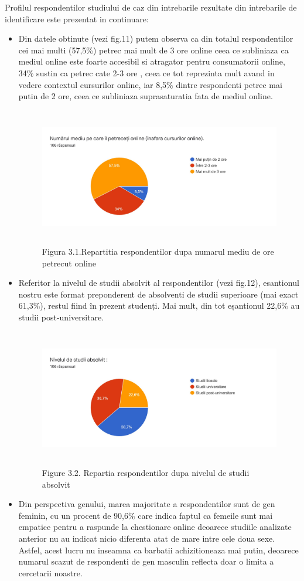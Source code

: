 \documentclass[a4paper, 12pt]{article}
\begin{document}
		\qquad Profilul respondentilor studiului de caz din intrebarile rezultate din intrebarile de identificare este prezentat in continuare:
		\begin{itemize}
			\item Din datele obtinute (vezi fig.11) putem observa ca din totalul respondentilor cei mai multi (57,5\%) petrec mai mult de 3 ore online ceea ce subliniaza ca mediul online este foarte accesibil si atragator pentru consumatorii online, 34\% sustin ca petrec cate 2-3 ore , ceea ce tot reprezinta mult avand in vedere contextul cursurilor online, iar 8,5\% dintre respondenti petrec mai putin de 2 ore, ceea ce subliniaza suprasaturatia  fata de mediul online.
			\begin{figure}[!htb]
				\centering
				\includegraphics[width=13cm, height=6cm]{"figures/prima.jpg"}
				\caption{Figura 3.1.Repartitia respondentilor dupa numarul mediu de ore petrecut online}\label{fig:zece}
			\end{figure}
	\newpage
		\item Referitor la nivelul de studii absolvit al respondentilor (vezi fig.12), esantionul nostru este format  preponderent de absolventi de studii superioare (mai exact 61,3\%), restul fiind în prezent studenți. Mai mult, din tot eșantionul 22,6\% au studii post-universitare.
			\begin{figure}[!htb]
			\centering
			\includegraphics[width=13cm, height=6cm]{"figures/doi.jpg"}
			\caption{Figure 3.2. Repartia respondentilor dupa nivelul de studii absolvit}\label{fig:zece}
		\end{figure}
		\item Din perspectiva genului, marea majoritate a respondentilor sunt de gen feminin, cu un procent de 90,6\% care indica faptul ca femeile sunt mai empatice pentru a raspunde la chestionare online deoarece studiile analizate anterior nu au indicat nicio diferenta atat de mare intre cele doua sexe. Astfel, acest lucru nu inseamna ca barbatii achizitioneaza mai putin, deoarece numarul scazut de respondenti de gen masculin reflecta doar o limita a cercetarii noastre.
		\end{itemize}
\end{document}
